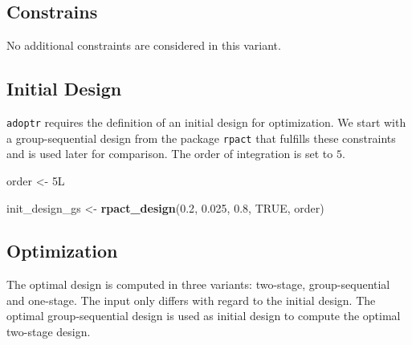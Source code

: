 \documentclass[]{book}
\newenvironment{Shaded}{\begin{snugshade}}{\end{snugshade}}
\newcommand{\ControlFlowTok}[1]{\textcolor[rgb]{0.13,0.29,0.53}{\textbf{#1}}}
\newcommand{\DataTypeTok}[1]{\textcolor[rgb]{0.13,0.29,0.53}{#1}}
\newcommand{\FloatTok}[1]{\textcolor[rgb]{0.00,0.00,0.81}{#1}}
\newcommand{\KeywordTok}[1]{\textcolor[rgb]{0.13,0.29,0.53}{\textbf{#1}}}
\newcommand{\NormalTok}[1]{#1}
\newcommand{\OperatorTok}[1]{\textcolor[rgb]{0.81,0.36,0.00}{\textbf{#1}}}
\newcommand{\OtherTok}[1]{\textcolor[rgb]{0.56,0.35,0.01}{#1}}
\newcommand{\StringTok}[1]{\textcolor[rgb]{0.31,0.60,0.02}{#1}}
\begin{document}
\hypertarget{constrains-7}{%
\subsection{Constrains}\label{constrains-7}}

No additional constraints are considered in this variant.

\hypertarget{initial-design-6}{%
\subsection{Initial Design}\label{initial-design-6}}

\texttt{adoptr} requires the definition of an initial design for optimization.
We start with a group-sequential design from the package \texttt{rpact} that
fulfills these constraints and is used later for comparison.
The order of integration is set to \(5\).

\begin{Shaded}
\begin{Highlighting}[]
\NormalTok{order <-}\StringTok{ }\NormalTok{5L }

\NormalTok{init_design_gs <-}\StringTok{ }\KeywordTok{rpact_design}\NormalTok{(}\FloatTok{0.2}\NormalTok{, }\FloatTok{0.025}\NormalTok{, }\FloatTok{0.8}\NormalTok{, }\OtherTok{TRUE}\NormalTok{, order)}
\end{Highlighting}
\end{Shaded}

\hypertarget{optimization-6}{%
\subsection{Optimization}\label{optimization-6}}

The optimal design is computed in three variants: two-stage, group-sequential
and one-stage.
The input only differs with regard to the initial design.
The optimal group-sequential design is used as initial design to
compute the optimal two-stage design.

\begin{Shaded}
\end{Shaded}
\end{document}
